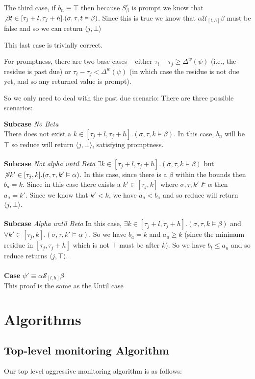 \documentclass[10pt,a4paper]{article}
\newcommand{\rp}[2]{\ensuremath{\langle #1, #2 \rangle}}
\begin{document}
The third case, if $b_n \equiv \top$ then because $S^i_{\beta}$ is prompt we know that $\not\exists t \in [\tau_j+l,\tau_j+h].(\sigma,\tau,t \vDash \beta)$. 
Since this is true we know that $\alpha \mathcal{U}_{[l,h]} \beta$ must be false and so we can return $\rp{j}{\bot}$

This last case is trivially correct.

For promptness, there are two base cases -- either $\tau_i-\tau_j \geq \Delta^w(\psi)$ (i.e., the residue is past due) or $\tau_i-\tau_j < \Delta^w(\psi)$ (in which case the residue is not due yet, and so any returned value is prompt).

So we only need to deal with the past due scenario: There are three possible scenarios:

\noindent \textbf{Subcase} \textit{No Beta} \\
There does not exist a $k \in [\tau_j+l,\tau_j+h].(\sigma,\tau,k \vDash \beta)$. In this case, $b_n$ will be $\top$ so reduce will return $\rp{j}{\bot}$, satisfying promptness.
\\ \\
\noindent \textbf{Subcase} \textit{Not alpha until Beta} 
$\exists k \in [\tau_j+l,\tau_j+h].(\sigma,\tau,k \vDash \beta)$ but $\not\forall k' \in [\tau_j,k].(\sigma, \tau, k' \vDash \alpha)$. In this case, since there is a $\beta$ within the bounds then $b_a = k$. Since in this case there exists a $k' \in [\tau_j,k]$ where $\sigma,\tau, k' \nvDash \alpha$ then $a_a = k'$. Since we know that $k' < k$, we have $a_a < b_a$ and so reduce will return $\rp{j}{\bot}$.
\\ \\
\noindent \textbf{Subcase} \textit{Alpha until Beta} 
In this case, $\exists k \in [\tau_j+l,\tau_j+h].(\sigma,\tau,k\vDash \beta)$ and $\forall k' \in [\tau_j,k].(\sigma,\tau,k' \vDash \alpha)$. So we have $b_a = k$ and $a_u \geq k$ (since the minimum residue in $[\tau_j,\tau_j+h]$ which is not $\top$ must be after $k$). So we have $b_t \leq a_u$ and so reduce returns $\rp{j}{\top}$.
\\ \\ %
\noindent \textbf{Case} $\psi' \equiv \alpha \mathcal{S}_{[l,h]} \beta$ \\
This proof is the same as the Until case

\pagebreak
\section{Algorithms}
\subsection{Top-level monitoring Algorithm}
Our top level aggressive monitoring algorithm is as follows:
\end{document}
